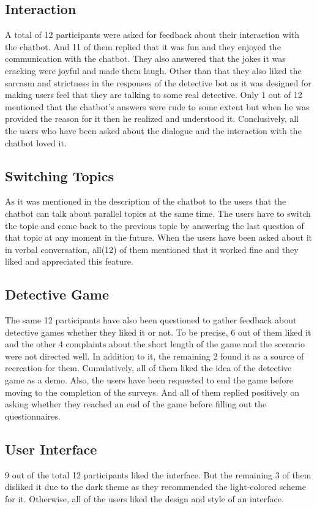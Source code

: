 \subsection{Interaction}
A total of 12 participants were asked for feedback about their interaction with the chatbot. And 11 of them replied that it was fun and they enjoyed the communication with the chatbot. They also answered that the jokes it was cracking were joyful and made them laugh. Other than that they also liked the sarcasm and strictness in the responses of the detective bot as it was designed for making users feel that they are talking to some real detective. Only 1 out of 12 mentioned that the chatbot's answers were rude to some extent but when he was provided the reason for it then he realized and understood it. Conclusively, all the users who have been asked about the dialogue and the interaction with the chatbot loved it.

\subsection{Switching Topics}
As it was mentioned in the description of the chatbot to the users that the chatbot can talk about parallel topics at the same time. The users have to switch the topic and come back to the previous topic by answering the last question of that topic at any moment in the future. When the users have been asked about it in verbal conversation, all(12) of them mentioned that it worked fine and they liked and appreciated this feature.

\subsection{Detective Game}
The same 12 participants have also been questioned to gather feedback about detective games whether they liked it or not. To be precise, 6 out of them liked it and the other 4 complaints about the short length of the game and the scenario were not directed well. In addition to it, the remaining 2 found it as a source of recreation for them. Cumulatively, all of them liked the idea of the detective game as a demo. Also, the users have been requested to end the game before moving to the completion of the surveys. And all of them replied positively on asking whether they reached an end of the game before filling out the questionnaires.

\subsection{User Interface}
9 out of the total 12 participants liked the interface. But the remaining 3 of them disliked it due to the dark theme as they recommended the light-colored scheme for it. Otherwise, all of the users liked the design and style of an interface.  



